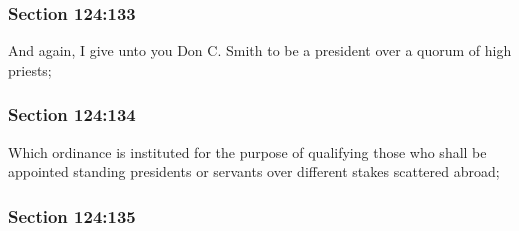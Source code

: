 
	\subsubsection{Section 124:133} %
		\label{DC124-133}

		And again, I give unto you Don C. Smith to be a president over a quorum of high priests;


	\subsubsection{Section 124:134} %
		\label{DC124-134}

		Which ordinance is instituted for the purpose of qualifying those who shall be appointed standing presidents or servants over different stakes scattered abroad;


	\subsubsection{Section 124:135} %
		\label{DC124-135}

